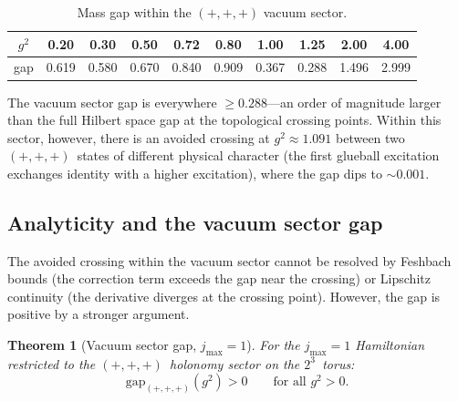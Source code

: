 \documentclass[12pt,a4paper]{article}
\newtheorem{theorem}{Theorem}[section]
\begin{document}
\begin{table}[ht]
\centering
\caption{Mass gap within the $(+,+,+)$ vacuum sector.}
\label{tab:vacgap}
\begin{tabular}{@{}cccccccccc@{}}
\toprule
$g^2$ & 0.20 & 0.30 & 0.50 & 0.72 & 0.80 & 1.00 & 1.25 & 2.00 & 4.00 \\
\midrule
gap & 0.619 & 0.580 & 0.670 & 0.840 & 0.909 & 0.367 & 0.288 & 1.496 & 2.999 \\
\bottomrule
\end{tabular}
\end{table}

The vacuum sector gap is everywhere $\ge 0.288$---an order of magnitude larger than the full Hilbert space gap at the topological crossing points. Within this sector, however, there is an avoided crossing at $g^2\approx 1.091$ between two $(+,+,+)$~states of different physical character (the first glueball excitation exchanges identity with a higher excitation), where the gap dips to $\sim 0.001$.

\subsection{Analyticity and the vacuum sector gap}\label{sec:analyticity}

The avoided crossing within the vacuum sector cannot be resolved by Feshbach bounds (the correction term exceeds the gap near the crossing) or Lipschitz continuity (the derivative diverges at the crossing point). However, the gap is positive by a stronger argument.

\begin{theorem}[Vacuum sector gap, $j_{\max}=1$]\label{thm:vac_gap}
For the $j_{\max}=1$ Hamiltonian restricted to the $(+,+,+)$~holonomy sector on the $2^3$~torus:
\begin{equation}
\mathrm{gap}_{(+,+,+)}(g^2) > 0 \qquad \text{for all } g^2 > 0.
\end{equation}
\end{theorem}
\end{document}

